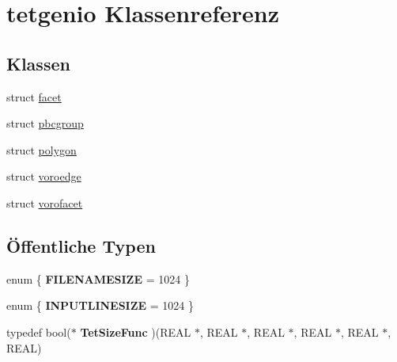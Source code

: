 \hypertarget{classtetgenio}{\section{tetgenio Klassenreferenz}
\label{classtetgenio}
}
\subsection*{Klassen}
\begin{DoxyCompactItemize}
\item 
struct \hyperlink{structtetgenio_1_1facet}{facet}
\item 
struct \hyperlink{structtetgenio_1_1pbcgroup}{pbcgroup}
\item 
struct \hyperlink{structtetgenio_1_1polygon}{polygon}
\item 
struct \hyperlink{structtetgenio_1_1voroedge}{voroedge}
\item 
struct \hyperlink{structtetgenio_1_1vorofacet}{vorofacet}
\end{DoxyCompactItemize}
\subsection*{Öffentliche Typen}
\begin{DoxyCompactItemize}
\item 
enum \{ {\bfseries F\-I\-L\-E\-N\-A\-M\-E\-S\-I\-Z\-E} = 1024
 \}
\item 
enum \{ {\bfseries I\-N\-P\-U\-T\-L\-I\-N\-E\-S\-I\-Z\-E} = 1024
 \}
\item 
\hypertarget{classtetgenio_aa1b228427a0bdabc66cead91dd4497b8}{typedef bool($\ast$ {\bfseries Tet\-Size\-Func} )(R\-E\-A\-L $\ast$, R\-E\-A\-L $\ast$, R\-E\-A\-L $\ast$, R\-E\-A\-L $\ast$, R\-E\-A\-L $\ast$, R\-E\-A\-L)}\label{classtetgenio_aa1b228427a0bdabc66cead91dd4497b8}

\end{DoxyCompactItemize}
